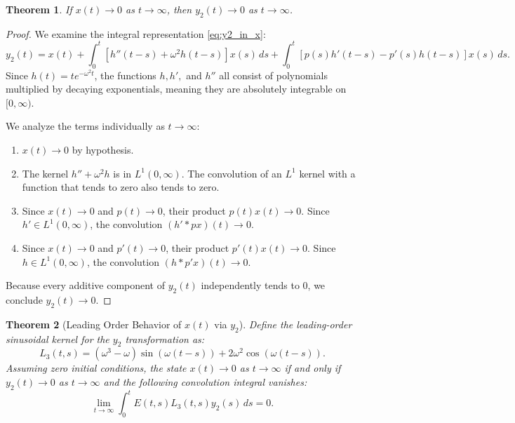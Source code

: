 \documentclass[10pt,reqno]{amsart}
\newtheorem{theorem}{Theorem}
\theoremstyle{definition}
\begin{document}
	\begin{theorem}
		If $x(t) \to 0$ as $t \to \infty$, then $y_2(t) \to 0$ as $t \to \infty$.
	\end{theorem}
	
	\begin{proof}
		We examine the integral representation \eqref{eq:y2_in_x}:
		\[ y_2(t) = x(t) + \int_0^t \left[ h''(t-s) + \omega^2 h(t-s) \right] x(s) \, ds + \int_0^t \left[ p(s)h'(t-s) - p'(s)h(t-s) \right] x(s) \, ds. \]
		Since $h(t) = t e^{-\omega^2 t}$, the functions $h, h',$ and $h''$ all consist of polynomials multiplied by decaying exponentials, meaning they are absolutely integrable on $[0, \infty)$. 
		
		We analyze the terms individually as $t \to \infty$:
		\begin{enumerate}
			\item $x(t) \to 0$ by hypothesis.
			\item The kernel $h'' + \omega^2 h$ is in $L^1(0, \infty)$. The convolution of an $L^1$ kernel with a function that tends to zero also tends to zero.
			\item Since $x(t) \to 0$ and $p(t) \to 0$, their product $p(t)x(t) \to 0$. Since $h' \in L^1(0, \infty)$, the convolution $(h' * px)(t) \to 0$.
			\item Since $x(t) \to 0$ and $p'(t) \to 0$, their product $p'(t)x(t) \to 0$. Since $h \in L^1(0, \infty)$, the convolution $(h * p'x)(t) \to 0$.
		\end{enumerate}
		Because every additive component of $y_2(t)$ independently tends to $0$, we conclude $y_2(t) \to 0$.
	\end{proof}
	
	\begin{theorem}[Leading Order Behavior of $x(t)$ via $y_2$] \label{thm:leading_x_y2}
		Define the leading-order sinusoidal kernel for the $y_2$ transformation as:
		\[ L_3(t, s) = (\omega^3 - \omega) \sin(\omega(t-s)) + 2\omega^2 \cos(\omega(t-s)). \]
		Assuming zero initial conditions, the state $x(t) \to 0$ as $t \to \infty$ if and only if $y_2(t) \to 0$ as $t \to \infty$ and the following convolution integral vanishes:
		\[ \lim_{t \to \infty} \int_0^t E(t, s) L_3(t, s) y_2(s) \, ds = 0. \]
	\end{theorem}
	
\end{document}
